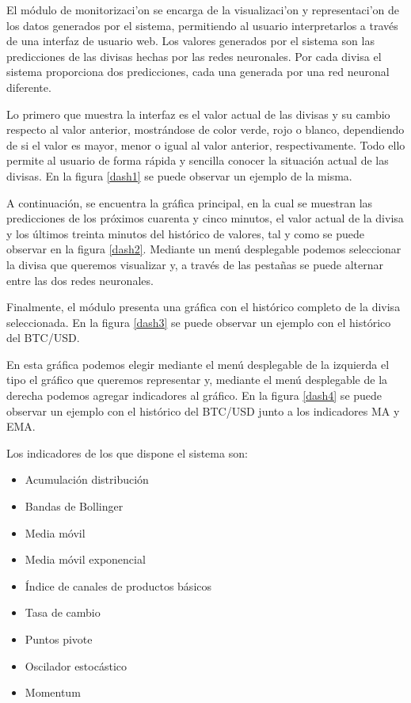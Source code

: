 El módulo de monitorizaci'on se encarga de la visualizaci'on y representaci'on de los datos generados por el sistema, permitiendo al usuario interpretarlos a través de una interfaz de usuario web.
Los valores generados por el sistema son las predicciones de las divisas hechas por las redes neuronales. Por cada divisa el sistema proporciona dos predicciones, cada una generada por una red neuronal diferente.

Lo primero que muestra la interfaz es el valor actual de las divisas y su cambio respecto al valor anterior, mostrándose de color verde, rojo o blanco, dependiendo de si el valor es mayor, menor o igual al valor anterior, respectivamente. Todo ello permite al usuario de forma rápida y sencilla conocer la situación actual de las divisas. En la figura \ref{dash1} se puede observar un ejemplo de la misma.


A continuación, se encuentra la gráfica principal, en la cual se muestran las predicciones de los próximos cuarenta y cinco minutos, el valor actual de la divisa y los últimos treinta minutos del histórico de valores, tal y como se puede observar en la figura \ref{dash2}.
Mediante un menú desplegable podemos seleccionar la divisa que queremos visualizar y, a través de las pestañas se puede alternar entre las dos redes neuronales.


Finalmente, el módulo presenta una gráfica con el histórico completo de la divisa seleccionada. En la figura \ref{dash3} se puede observar un ejemplo con el histórico del BTC/USD.

En esta gráfica podemos elegir mediante el menú desplegable de la izquierda el tipo el gráfico que queremos representar y, mediante el menú desplegable de la derecha podemos agregar indicadores al gráfico. En la figura \ref{dash4} se puede observar un ejemplo con el histórico del BTC/USD junto a los indicadores MA y EMA.


Los indicadores de los que dispone el sistema son:
\begin{itemize}
\item Acumulación distribución
\item Bandas de Bollinger
\item Media móvil
\item Media móvil exponencial
\item Índice de canales de productos básicos
\item Tasa de cambio
\item Puntos pivote
\item Oscilador estocástico
\item Momentum
\end{itemize}

